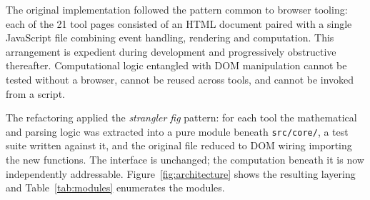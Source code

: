\documentclass[11pt,a4paper]{article}
\begin{document}
The original implementation followed the pattern common to browser tooling:
each of the 21 tool pages consisted of an HTML document paired with a single
JavaScript file combining event handling, rendering and computation. This
arrangement is expedient during development and progressively obstructive
thereafter. Computational logic entangled with DOM manipulation cannot be
tested without a browser, cannot be reused across tools, and cannot be invoked
from a script.

The refactoring applied the \emph{strangler fig} pattern: for each tool the
mathematical and parsing logic was extracted into a pure module beneath
\texttt{src/core/}, a test suite written against it, and the original file
reduced to DOM wiring importing the new functions. The interface is unchanged;
the computation beneath it is now independently addressable. Figure~\ref{fig:architecture} shows the
resulting layering and Table~\ref{tab:modules} enumerates the modules.
\end{document}

